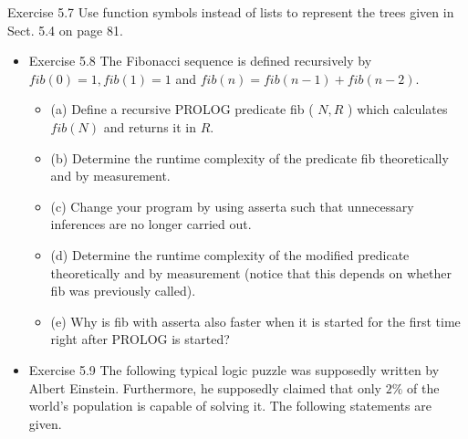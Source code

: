 \documentclass[10pt]{book}
\begin{document}
Exercise 5.7 Use function symbols instead of lists to represent the trees given in Sect. 5.4 on page 81.

\begin{itemize}
  \item Exercise 5.8 The Fibonacci sequence is defined recursively by $f i b(0)=1, f i b(1)=1$ and $f i b(n)=f i b(n-1)+f i b(n-2)$.
  \begin{itemize}
    \item (a) Define a recursive PROLOG predicate fib ( $N, R$ ) which calculates $f i b(N)$ and returns it in $R$.
    \item (b) Determine the runtime complexity of the predicate fib theoretically and by measurement.
    \item (c) Change your program by using asserta such that unnecessary inferences are no longer carried out.
    \item (d) Determine the runtime complexity of the modified predicate theoretically and by measurement (notice that this depends on whether fib was previously called).
    \item (e) Why is fib with asserta also faster when it is started for the first time right after PROLOG is started?
  \end{itemize}
  \item Exercise 5.9 The following typical logic puzzle was supposedly written by Albert Einstein. Furthermore, he supposedly claimed that only $2 \%$ of the world's population is capable of solving it. The following statements are given.
\end{itemize}
\end{document}
